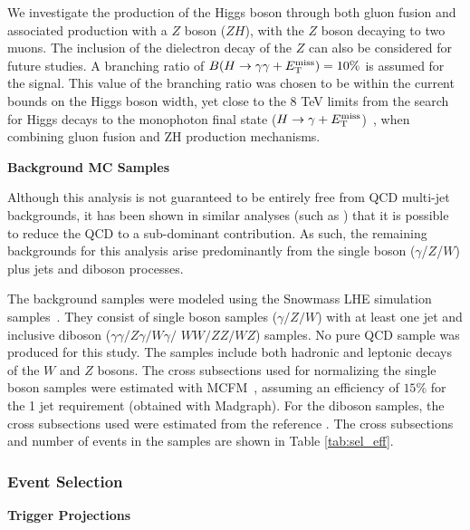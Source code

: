We investigate the production of the Higgs boson through both gluon fusion and associated production with a $Z$ boson ($ZH$), with the $Z$ boson decaying to two muons. The inclusion of the dielectron decay of the $Z$ can also be considered for future studies.
%
A branching ratio of ${B}(H\to\gamma\gamma+E_{\mathrm{T}}^{\text{miss}}) = 10\%$ is assumed for the signal. This value of the branching ratio was chosen to be within the current bounds on the Higgs boson width, yet close to the 8 TeV limits from the search for Higgs decays to the monophoton final state ($H\to\gamma+E_{\mathrm{T}}^{\text{miss}}$)~\cite{lowmonophoton}, when combining gluon fusion and ZH production mechanisms.


\vspace{0.2cm} \textbf{Background MC Samples}

Although this analysis is not guaranteed to be entirely free from QCD multi-jet backgrounds, it has been shown in similar analyses (such as \cite{lowmonophoton}) that it is possible to reduce the QCD to a sub-dominant contribution. As such, the remaining backgrounds for this analysis arise predominantly from the single boson ($\gamma$/$Z$/$W$) plus jets and diboson processes.

The background samples were modeled using the Snowmass LHE simulation samples~\cite{Anderson:2013kxz}. They consist of single boson samples ($\gamma/Z/W$) with at least one jet and inclusive diboson ($\gamma\gamma/Z\gamma/W\gamma/$ $WW/ZZ/WZ$) samples. No pure QCD sample was produced for this study. The samples include both hadronic and leptonic decays of the $W$ and $Z$ bosons. The cross subsections used for normalizing the single boson samples were estimated with MCFM~\cite{MCFM}, assuming an efficiency of $15\%$ for the 1 jet requirement (obtained with Madgraph). For the diboson samples, the cross subsections used were estimated from the reference \cite{Campbell:2011bn}. The cross subsections and number of events in the samples are shown in Table \ref{tab:sel_eff}.


\subsubsection{Event Selection}

\vspace{0.2cm} \textbf{Trigger Projections}

